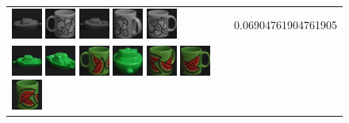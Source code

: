 \begin{figure}[tbp]
\begin{center}
\begin{tabular}{m{11cm} | m{3cm} |}
\includegraphics[width=1cm]{coil/beeld-27.eps}
\includegraphics[width=1cm]{coil/beeld-51.eps}
\includegraphics[width=1cm]{coil/beeld-24.eps}
\includegraphics[width=1cm]{coil/beeld-49.eps}
\includegraphics[width=1cm]{coil/beeld-48.eps}
& {\scriptsize 0.06904761904761905}
\\
\includegraphics[width=1cm]{coil/beeld-54.eps}
\includegraphics[width=1cm]{coil/beeld-58.eps}
\includegraphics[width=1cm]{coil/beeld-31.eps}
\includegraphics[width=1cm]{coil/beeld-56.eps}
\includegraphics[width=1cm]{coil/beeld-33.eps}
\includegraphics[width=1cm]{coil/beeld-30.eps}
\includegraphics[width=1cm]{coil/beeld-32.eps}

\end{tabular}
\end{center}
\end{figure}
